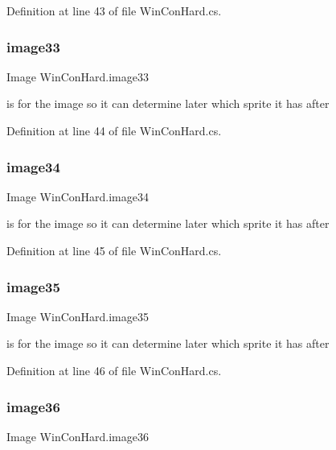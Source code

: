Definition at line 43 of file Win\+Con\+Hard.\+cs.

\mbox{\label{class_win_con_hard_a8ce589b64b69ad3375cbc41b9d604395}} 
\subsubsection{\texorpdfstring{image33}{image33}}
{\footnotesize\ttfamily Image Win\+Con\+Hard.\+image33}

is for the image so it can determine later which sprite it has after 

Definition at line 44 of file Win\+Con\+Hard.\+cs.

\mbox{\label{class_win_con_hard_a7c21fe2dcc048479759160bd62dfeb0e}} 
\subsubsection{\texorpdfstring{image34}{image34}}
{\footnotesize\ttfamily Image Win\+Con\+Hard.\+image34}

is for the image so it can determine later which sprite it has after 

Definition at line 45 of file Win\+Con\+Hard.\+cs.

\mbox{\label{class_win_con_hard_a8df0ba74406e0bd5521c44a7475fdf8d}} 
\subsubsection{\texorpdfstring{image35}{image35}}
{\footnotesize\ttfamily Image Win\+Con\+Hard.\+image35}

is for the image so it can determine later which sprite it has after 

Definition at line 46 of file Win\+Con\+Hard.\+cs.

\mbox{\label{class_win_con_hard_ac9ff21c5b4cc9b5aa60235c0c73fd743}} 
\subsubsection{\texorpdfstring{image36}{image36}}
{\footnotesize\ttfamily Image Win\+Con\+Hard.\+image36}

